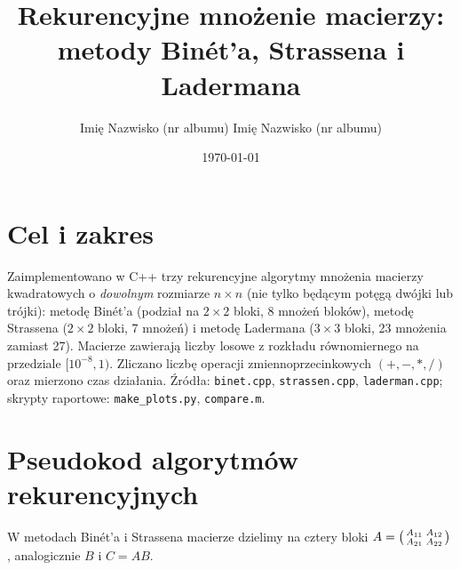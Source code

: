 \documentclass[10pt,a4paper]{article}
\title{\vspace{-1.2cm}\textbf{Rekurencyjne mnożenie macierzy:\\ metody Binét'a, Strassena i Ladermana}\vspace{-0.3cm}}
\author{Imię Nazwisko (nr albumu) \quad\textbullet\quad Imię Nazwisko (nr albumu)}
\date{\today}
\begin{document}
\maketitle
\vspace{-0.6cm}

\section{Cel i zakres}
Zaimplementowano w C++ trzy rekurencyjne algorytmy mnożenia macierzy kwadratowych
o \emph{dowolnym} rozmiarze $n\times n$ (nie tylko będącym potęgą dwójki lub trójki): metodę Binét'a (podział
na $2\times2$ bloki, 8 mnożeń bloków), metodę Strassena ($2\times2$ bloki, 7 mnożeń) i metodę Ladermana
($3\times3$ bloki, 23 mnożenia zamiast 27). Macierze zawierają liczby losowe z rozkładu równomiernego
na przedziale $[10^{-8}, 1)$. Zliczano liczbę operacji zmiennoprzecinkowych $(+,-,*,/)$ oraz mierzono czas
działania. Źródła: \texttt{binet.cpp}, \texttt{strassen.cpp}, \texttt{laderman.cpp}; skrypty raportowe:
\texttt{make\_plots.py}, \texttt{compare.m}.

\section{Pseudokod algorytmów rekurencyjnych}
W metodach Binét'a i Strassena macierze dzielimy na cztery bloki $A=\begin{psmallmatrix}A_{11}&A_{12}\\A_{21}&A_{22}\end{psmallmatrix}$,
analogicznie $B$ i $C=AB$.
\end{document}
